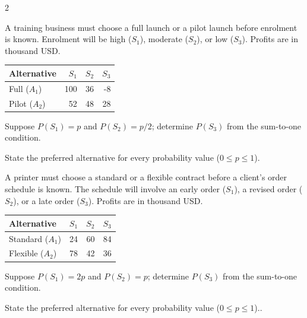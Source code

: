 \begin{multicols}{2}
\begin{minipage}{\linewidth}
A training business must choose a full launch or a pilot launch before enrolment is known. Enrolment will be high ($S_1$), moderate ($S_2$), or low ($S_3$). Profits are in thousand USD.
\begin{center}\small\setlength{\tabcolsep}{4pt}
\begin{tabular}{@{}lrrr@{}}\toprule
Alternative&$S_1$&$S_2$&$S_3$\\\midrule
Full ($A_1$)&100&36&-8\\
Pilot ($A_2$)&52&48&28\\\bottomrule
\end{tabular}\end{center}
Suppose $P(S_1)=p$ and $P(S_2)=p/2$; determine $P(S_3)$ from the sum-to-one condition.

State the preferred alternative for every probability value ($0\le p\le1$). 
\end{minipage}\par

\begin{minipage}{\linewidth}
A printer must choose a standard or a flexible contract before a client's order schedule is known. The schedule will involve an early order ($S_1$), a revised order ($S_2$), or a late order ($S_3$). Profits are in thousand USD.
\begin{center}\small\setlength{\tabcolsep}{4pt}
\begin{tabular}{@{}lrrr@{}}\toprule
Alternative&$S_1$&$S_2$&$S_3$\\\midrule
Standard ($A_1$)&24&60&84\\
Flexible ($A_2$)&78&42&36\\\bottomrule
\end{tabular}\end{center}
Suppose $P(S_1)=2p$ and $P(S_2)=p$; determine $P(S_3)$ from the sum-to-one condition.

State the preferred alternative for every probability value ($0\le p\le1$).. 
\end{minipage}\par
\end{multicols}

